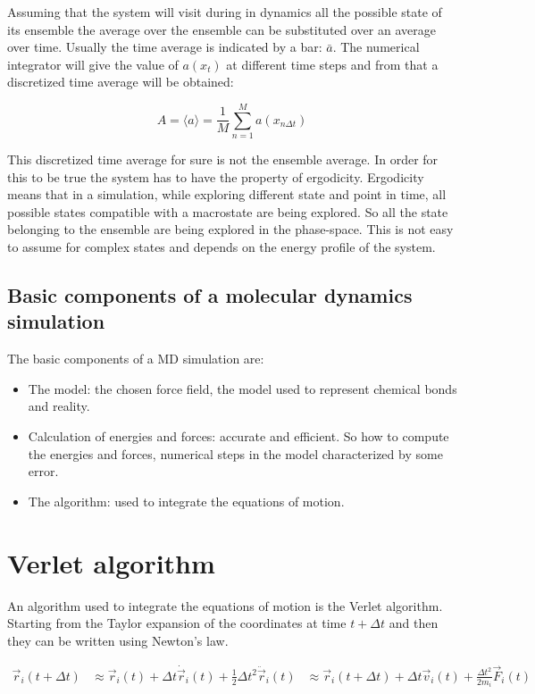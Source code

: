 	Assuming that the system will visit during in dynamics all the possible state of its ensemble the average over the ensemble can be substituted over an average over time.
	Usually the time average is indicated by a bar: $\bar{a}$.
	The numerical integrator will give the value of $a(x_t)$ at different time steps and from that a discretized time average will be obtained:

	$$A = \langle a\rangle = \frac{1}{M}\sum\limits_{n=1}^M a(x_{n\Delta t})$$

	This discretized time average for sure is not the ensemble average.
	In order for this to be true the system has to have the property of ergodicity.
	Ergodicity means that in a simulation, while exploring different state and point in time, all possible states compatible with a macrostate are being explored.
	So all the state belonging to the ensemble are being explored in the phase-space.
	This is not easy to assume for complex states and depends on the energy profile of the system.

	\subsection{Basic components of a molecular dynamics simulation}
	The basic components of a MD simulation are:

	\begin{multicols}{2}
		\begin{itemize}
			\item The model: the chosen force field, the model used to represent chemical bonds and reality.
			\item Calculation of energies and forces: accurate and efficient.
				So how to compute the energies and forces, numerical steps in the model characterized by some error.
			\item The algorithm: used to integrate the equations of motion.

		\end{itemize}
	\end{multicols}

\section{Verlet algorithm}
An algorithm used to integrate the equations of motion is the Verlet algorithm.
Starting from the Taylor expansion of the coordinates at time $t+\Delta t$ and then they can be written using Newton's law.

\begin{align*}
	\vec{r}_i(t+\Delta t)&\approx \vec{r}_i(t) + \Delta t\dot{\vec{r}}_i(t) + \frac{1}{2}\Delta t^2\ddot{\vec{r}}_i(t)
											 &\approx\vec{r}_i(t+\Delta t)+\Delta t\vec{v}_i(t)+\frac{\Delta t^2}{2m_i}\vec{F}_i(t) \\
\end{align*}

